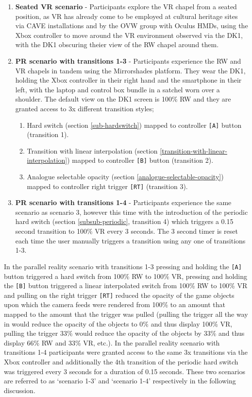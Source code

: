 \begin{enumerate}
	\item \textbf{Seated VR scenario} - Participants explore the VR chapel from a seated position, as VR has already come to be employed at cultural heritage sites via CAVE installations and by the OVW group with Oculus HMDs, using the Xbox controller to move around the VR environment observed via the DK1, with the DK1 obscuring theier view of the RW chapel around them.
	\item \textbf{PR scenario with transitions 1-3} - Participants experience the RW and VR chapels in tandem using the Mirrorshades platform. They wear the DK1, holding the Xbox controller in their right hand and the smartphone in their left, with the laptop and control box bundle in a satchel worn over a shoulder. The default view on the DK1 screen is 100\% RW and they are granted access to 3x different transition styles;
	\begin{enumerate}
		\item Hard switch (section \ref{sub-hardswitch}) mapped to controller \texttt{[A]} button (transition 1).
		\item Transition with linear interpolation (section \ref{transition-with-linear-interpolation}) mapped to controller \texttt{[B]} button (transition 2).
		\item Analogue selectable opacity (section \ref{analogue-selectable-opacity}) mapped to controller right trigger \texttt{[RT]} (transition 3).
\end{enumerate}
	\item \textbf{PR scenario with transitions 1-4} - Participants experience the same scenario as scenario 3, however this time with the introduction of the periodic hard switch (section \ref{subsub-periodic}, transition 4) which triggers a 0.15 second transition to 100\% VR every 3 seconds. The 3 second timer is reset each time the user manually triggers a transition using any one of transitions 1-3.
\end{enumerate}

In the parallel reality scenario with transitions 1-3 pressing and holding the \texttt{[A]} button triggered a hard switch from 100\% RW to 100\% VR, pressing and holding the \texttt{[B]} button triggered a linear interpolated switch from 100\% RW to 100\% VR and pulling on the right trigger \texttt{[RT]} reduced the opacity of the game objects upon which the camera feeds were rendered from 100\% to an amount that mapped to the amount that the trigger was pulled (pulling the trigger all the way in would reduce the opacity of the objects to 0\% and thus display 100\% VR, pulling the trigger 33\% would reduce the opacity of the objects by 33\% and thus display 66\% RW and 33\% VR, etc.). In the parallel reality scenario with transitions 1-4 participants were granted access to the same 3x transitions via the Xbox controller and additionally the 4th transition of the periodic hard switch was triggered every 3 seconds for a duration of 0.15 seconds. These two scenarios are referred to as `scenario 1-3' and `scenario 1-4' respectively in the following discussion.

